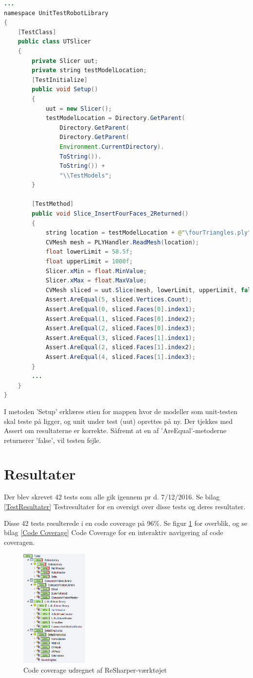 \begin{lstlisting}[language=Java]
...
namespace UnitTestRobotLibrary
{
	[TestClass]
	public class UTSlicer
	{
		private Slicer uut;
		private string testModelLocation;
		[TestInitialize]
		public void Setup()
		{
			uut = new Slicer();
			testModelLocation = Directory.GetParent(
				Directory.GetParent(
				Directory.GetParent(
				Environment.CurrentDirectory).
				ToString()).
				ToString()) +
				"\\TestModels";
		}

		[TestMethod]
		public void Slice_InsertFourFaces_2Returned()
		{
			string location = testModelLocation + @"\fourTriangles.ply";
			CVMesh mesh = PLYHandler.ReadMesh(location);
			float lowerLimit = 58.5f;
			float upperLimit = 1000f;
			Slicer.xMin = float.MinValue;
			Slicer.xMax = float.MaxValue;
			CVMesh sliced = uut.Slice(mesh, lowerLimit, upperLimit, false);
			Assert.AreEqual(5, sliced.Vertices.Count);
			Assert.AreEqual(0, sliced.Faces[0].index1);
			Assert.AreEqual(1, sliced.Faces[0].index2);
			Assert.AreEqual(2, sliced.Faces[0].index3);
			Assert.AreEqual(3, sliced.Faces[1].index1);
			Assert.AreEqual(2, sliced.Faces[1].index2);
			Assert.AreEqual(4, sliced.Faces[1].index3);
		}
		...
	}
}
\end{lstlisting}
I metoden 'Setup' erklæres stien for mappen hvor de modeller som unit-testen skal teste på ligger, og unit under test (uut) oprettes på ny. Der tjekkes med Assert om resultaterne er korrekte. Såfremt at en af 'AreEqual'-metoderne returnerer 'false', vil testen fejle.
\newpage
\section{Resultater}
Der blev skrevet 42 tests som alle gik igennem pr d. 7/12/2016.
Se bilag \ref{TestResultater} Testresultater for en oversigt over disse tests og deres resultater.

Disse 42 tests resulterede i en code coverage på 96\%. Se figur \ref{CodeCoverage} for overblik, og se bilag \ref{Code Coverage} Code Coverage for en interaktiv navigering af code coveragen. 

\begin{figure}[H]
    \centering
    \includegraphics[width=0.3\textwidth]{figurer/d/Test/coverage}
    \caption{Code coverage udregnet af ReSharper-værktøjet}
    \label{CodeCoverage}
\end{figure}

